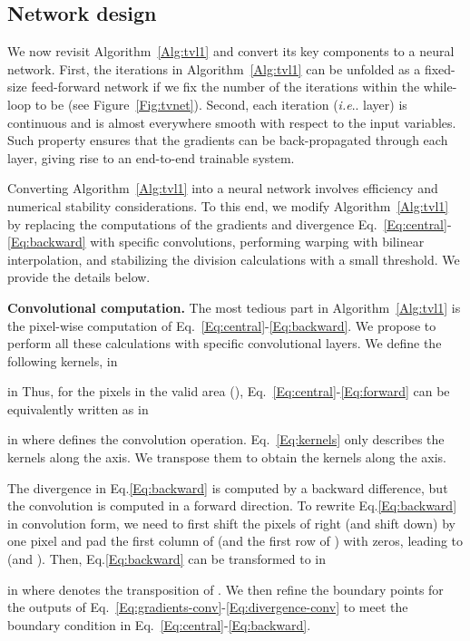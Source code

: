 \documentclass[10pt,twocolumn,letterpaper]{article}
\makeatletter
\DeclareRobustCommand\onedot{\futurelet\@let@token\@onedot}
\def\@onedot{\ifx\@let@token.\else.\null\fi\xspace}
\def\ie{\emph{i.e}\onedot} \def\Ie{\emph{I.e}\onedot}
\makeatother
\begin{document}
\subsection{Network design}
\label{Sec:network}
We now revisit Algorithm~\ref{Alg:tvl1} and convert its key components to a neural network.
First, the iterations in Algorithm~\ref{Alg:tvl1} can be unfolded as a fixed-size feed-forward network if we fix the number of the iterations within the while-loop to be  (see Figure~\ref{Fig:tvnet}).
Second, each iteration (\ie layer) is continuous and is almost everywhere smooth with respect to the input variables. Such property ensures that the gradients can be back-propagated through each layer, giving rise to an end-to-end trainable system.


Converting Algorithm~\ref{Alg:tvl1} into a neural network involves efficiency and numerical stability considerations. To this end, we modify Algorithm~\ref{Alg:tvl1} by replacing the computations of the gradients and divergence Eq.~\eqref{Eq:central}-\eqref{Eq:backward} with specific convolutions, performing warping with bilinear interpolation, and stabilizing the division calculations with a small threshold.  We provide the details below.


\textbf{Convolutional computation.}
The most tedious part in Algorithm~\ref{Alg:tvl1} is the pixel-wise computation of Eq.~\eqref{Eq:central}-\eqref{Eq:backward}.
We propose to perform all these calculations with specific convolutional layers.
We define the following kernels,
 in

 in
\noindent
Thus, for the pixels in the valid area (), Eq.~\eqref{Eq:central}-\eqref{Eq:forward} can be equivalently written as
 in

 in \noindent
where  defines the convolution operation. Eq.~\eqref{Eq:kernels} only describes the kernels along the  axis. We transpose them  to obtain the kernels along the  axis.

The divergence in Eq.\eqref{Eq:backward} is computed by a backward difference, but the convolution is computed in a forward direction. To rewrite Eq.\eqref{Eq:backward} in convolution form, we need to first shift the pixels of  right (and shift  down) by one pixel and pad the first column of  (and the first row of ) with zeros, leading to  (and ). Then, Eq.\eqref{Eq:backward} can be transformed to
 in

 in \noindent
where  denotes the transposition of .
We then refine the boundary points for the outputs of Eq.~\eqref{Eq:gradients-conv}-\eqref{Eq:divergence-conv} to meet the boundary condition in Eq.~\eqref{Eq:central}-\eqref{Eq:backward}.
\end{document}
